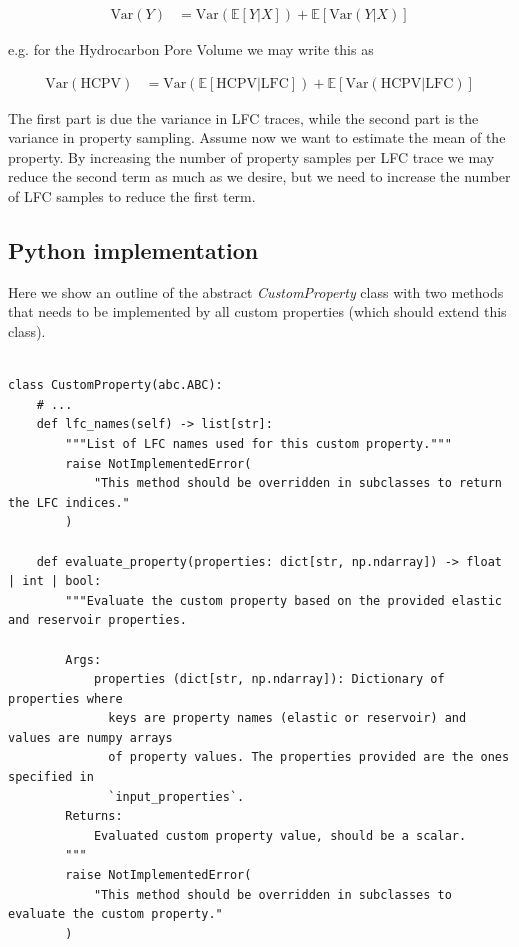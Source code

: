 \documentclass[note,screen,english,12pt,utf8]{nrdoc}
\begin{document}
\begin{align*}
\text{Var}(Y) &= \text{Var}(\mathbb{E}[Y | X]) + \mathbb{E}[\text{Var}(Y | X)]
\end{align*}

e.g. for the Hydrocarbon Pore Volume we may write this as

\begin{align*}
\text{Var}(\text{HCPV}) &= \text{Var}(\mathbb{E}[\text{HCPV} | \text{LFC}]) + \mathbb{E}[\text{Var}(\text{HCPV} | \text{LFC})]
\end{align*}

The first part is due the variance in LFC traces, while the second part
is the variance in property sampling. Assume now we want to estimate the
mean of the property. By increasing the number of property
samples per LFC trace we may reduce the second term as much as we desire,
but we need to increase the number of LFC samples to reduce the first term.


\subsection{Python implementation}

Here we show an outline of the abstract \emph{CustomProperty} class with
two methods that needs to be implemented by all custom properties (which
should extend this class).

\begin{verbatim}

class CustomProperty(abc.ABC):
    # ...
    def lfc_names(self) -> list[str]:
        """List of LFC names used for this custom property."""
        raise NotImplementedError(
            "This method should be overridden in subclasses to return the LFC indices."
        )

    def evaluate_property(properties: dict[str, np.ndarray]) -> float | int | bool:
        """Evaluate the custom property based on the provided elastic and reservoir properties.

        Args:
            properties (dict[str, np.ndarray]): Dictionary of properties where
              keys are property names (elastic or reservoir) and values are numpy arrays
              of property values. The properties provided are the ones specified in
              `input_properties`.
        Returns:
            Evaluated custom property value, should be a scalar.
        """
        raise NotImplementedError(
            "This method should be overridden in subclasses to evaluate the custom property."
        )
\end{verbatim}
\end{document}
